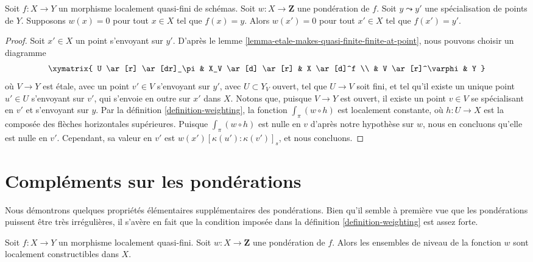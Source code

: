 \begin{lemma}
\label{lemma-weighting-specialization}
Soit $f : X \to Y$ un morphisme localement quasi-fini de schémas.
Soit $w : X \to \mathbf{Z}$ une pondération de $f$.
Soit $y \leadsto y'$ une spécialisation de points de $Y$.
Supposons $w(x) = 0$ pour tout $x \in X$ tel que $f(x) = y$. Alors
$w(x') = 0$ pour tout $x' \in X$ tel que $f(x') = y'$.
\end{lemma}

\begin{proof}
Soit $x' \in X$ un point s'envoyant sur $y'$. D'après le
lemme \ref{lemma-etale-makes-quasi-finite-finite-at-point},
nous pouvons choisir un diagramme
$$
\xymatrix{
U \ar[r] \ar[dr]_\pi & X_V \ar[d] \ar[r] & X \ar[d]^f \\
& V \ar[r]^\varphi & Y
}
$$
où $V \to Y$ est \'etale, avec un point $v' \in V$ s'envoyant sur $y'$,
avec $U \subset Y_V$ ouvert, tel que $U \to V$ soit fini, et
tel qu'il existe un unique point $u' \in U$ s'envoyant sur $v'$,
qui s'envoie en outre sur $x'$ dans $X$. Notons que, puisque $V \to Y$ est ouvert,
il existe un point $v \in V$ se spécialisant en $v'$ et s'envoyant sur $y$.
Par la définition \ref{definition-weighting}, la fonction
$\int_\pi (w \circ h)$ est localement constante, où $h : U \to X$ est
la composée des flèches horizontales supérieures.
Puisque $\int_\pi (w \circ h)$ est nulle en $v$ d'après
notre hypothèse sur $w$, nous en concluons qu'elle est nulle
en $v'$. Cependant, sa valeur en $v'$ est $w(x')[\kappa(u'):\kappa(v')]_s$,
et nous concluons.
\end{proof}




\section{Compléments sur les pondérations}
\label{section-more-weightings}

\noindent
Nous démontrons quelques propriétés élémentaires supplémentaires des pondérations. Bien
qu'il semble à première vue que les pondérations puissent être très irrégulières, il
s'avère en fait que la condition imposée dans la
définition \ref{definition-weighting} est assez forte.

\begin{lemma}
\label{lemma-jumps-w}
Soit $f : X \to Y$ un morphisme localement quasi-fini.
Soit $w : X \to \mathbf{Z}$ une pondération de $f$. Alors
les ensembles de niveau de la fonction $w$ sont localement constructibles dans $X$.
\end{lemma}

